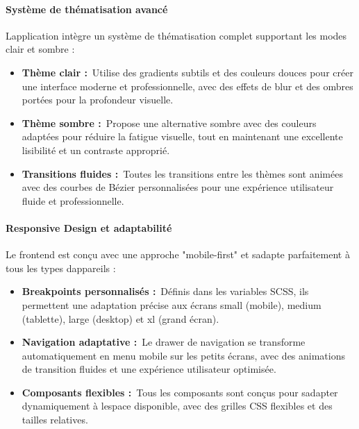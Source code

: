 \documentclass[12pt,a4paper,twoside,openright]{report}
\begin{document}
\hypertarget{systuxe8me-de-thuxe9matisation-avancuxe9}{%
\paragraph{Système de thématisation
avancé}\label{systuxe8me-de-thuxe9matisation-avancuxe9}}

L\textquotesingle application intègre un système de thématisation
complet supportant les modes clair et sombre :

\begin{itemize}
\item
  \textbf{Thème clair :}~Utilise des gradients subtils et des couleurs
  douces pour créer une interface moderne et professionnelle, avec des
  effets de blur et des ombres portées pour la profondeur visuelle.
\item
  \textbf{Thème sombre :}~Propose une alternative sombre avec des
  couleurs adaptées pour réduire la fatigue visuelle, tout en maintenant
  une excellente lisibilité et un contraste approprié.
\item
  \textbf{Transitions fluides :}~Toutes les transitions entre les thèmes
  sont animées avec des courbes de Bézier personnalisées pour une
  expérience utilisateur fluide et professionnelle.
\end{itemize}

\hypertarget{responsive-design-et-adaptabilituxe9}{%
\paragraph{Responsive Design et
adaptabilité}\label{responsive-design-et-adaptabilituxe9}}

Le frontend est conçu avec une approche "mobile-first" et
s\textquotesingle adapte parfaitement à tous les types
d\textquotesingle appareils :

\begin{itemize}
\item
  \textbf{Breakpoints personnalisés :}~Définis dans les variables SCSS,
  ils permettent une adaptation précise aux écrans small (mobile),
  medium (tablette), large (desktop) et xl (grand écran).
\item
  \textbf{Navigation adaptative :}~Le drawer de navigation se transforme
  automatiquement en menu mobile sur les petits écrans, avec des
  animations de transition fluides et une expérience utilisateur
  optimisée.
\item
  \textbf{Composants flexibles :}~Tous les composants sont conçus pour
  s\textquotesingle adapter dynamiquement à l\textquotesingle espace
  disponible, avec des grilles CSS flexibles et des tailles relatives.
\end{itemize}
\end{document}
